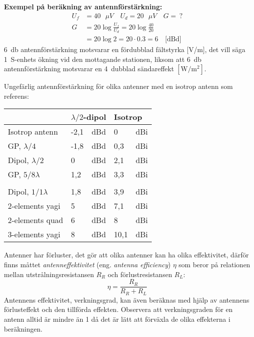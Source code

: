 \vspace{1ex}
\noindent\textbf{Exempel på beräkning av antennförstärkning:}
\begin{align*}
  U_f &= 40\text{ \(\mu V\)} \quad U_d = 20\text{ \(\mu V\)} \quad G =\ ? \\
  G &= 20 \log\frac{U_f}{U_d} = 20 \log\frac{40}{20} \\
  &= 20 \log 2 = 20\cdot 0.3 = 6 \quad \text{[dBd]}
\end{align*}
\SI{6}{\decibel} antennförstärkning motsvarar en fördubblad fältstyrka [V/m], det vill säga
1~S-enhets ökning vid den mottagande stationen, liksom att \SI{6}{\decibel}
antennförstärkning motsvarar en 4~dubblad sändareffekt \(\mathrm{[W/m^2]}\).

\newpage
\noindent
Ungefärlig antennförstärkning för olika antenner med en isotrop antenn som
referens:
\vspace{1ex}
\begin{center}
\begin{tabular}{l|ll|ll}
  & \multicolumn{2}{l|}{\(\lambda/2\)-dipol} &
  \multicolumn{2}{l}{Isotrop} \\
  \hline
  Isotrop antenn       & -2,1 & dBd & 0   & dBi \\
  GP, \(\lambda/4\)    & -1,8 & dBd & 0,3 & dBi \\
  Dipol, \(\lambda/2\) & 0    & dBd & 2,1 & dBi \\
  GP, \(5/8\lambda\)   & 1,2  & dBd & 3,3 & dBi \\
  & & & & \\
  Dipol, \(1/1\lambda\) & 1,8 & dBd & 3,9  & dBi \\
  2-elements yagi       & 5   & dBd & 7,1  & dBi \\
  2-elements quad       & 6   & dBd & 8    & dBi \\
  3-elements yagi       & 8   & dBd & 10,1 & dBi \\
\end{tabular}
\end{center}

\vspace{1ex}
\noindent
Antenner har förluster, det gör att olika antenner kan ha olika
effektivitet, därför finns måttet \emph{antenneffektivitet}
(eng. \emph{antenna efficiency}) \(\eta\) som beror på relationen mellan
utstrålningsresistansen \(R_R\) och förlustresistansen \(R_L\):
\[\eta = \frac{R_R}{R_R+R_L}\]
Antennens effektivitet, verkningsgrad, kan även beräknas med hjälp av antennens
förlusteffekt och den tillförda effekten.
Observera att verkningsgraden för en antenn alltid är mindre än 1 då det är lätt
att förväxla de olika effekterna i beräkningen.

